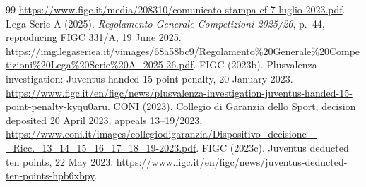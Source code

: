 \documentclass[11pt]{article}
\begin{document}
\begin{thebibliography}{99}
\url{https://www.figc.it/media/208310/comunicato-stampa-cf-7-luglio-2023.pdf}.
Lega Serie A (2025). \emph{Regolamento Generale Competizioni 2025/26},
p.~44, reproducing FIGC 331/A, 19 June 2025.
\url{https://img.legaseriea.it/vimages/68a58bc9/Regolamento%20Generale%20Competizioni%20Lega%20Serie%20A_2025-26.pdf}.
FIGC (2023b). Plusvalenza investigation: Juventus handed 15-point penalty,
20 January 2023.
\url{https://www.figc.it/en/figc/news/plusvalenza-investigation-juventus-handed-15-point-penalty-kyqu0aru}.
CONI (2023). Collegio di Garanzia dello Sport, decision deposited 20 April 2023,
appeals 13--19/2023.
\url{https://www.coni.it/images/collegiodigaranzia/Dispositivo_decisione_-_Ricc._13_14_15_16_17_18_19-2023.pdf}.
FIGC (2023c). Juventus deducted ten points, 22 May 2023.
\url{https://www.figc.it/en/figc/news/juventus-deducted-ten-points-hpb6xbpy}.
\end{thebibliography}
\end{document}
